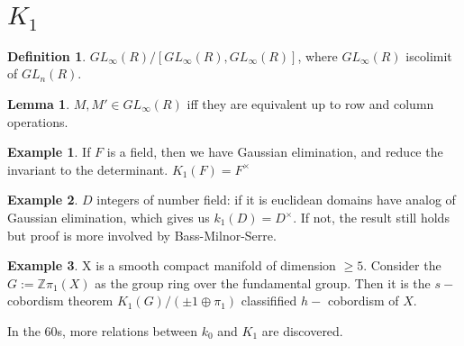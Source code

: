 \documentclass{article}
\theoremstyle{definition}
\theoremstyle{definition}
\newtheorem{definition}{Definition}[section]
\theoremstyle{definition}
\theoremstyle{definition}
\theoremstyle{definition}
\newtheorem{lemma}[theorem]{Lemma}
\theoremstyle{definition}
\theoremstyle{definition}
\newtheorem{example}{Example}[section]
\begin{document}
\section{$K_1$}

\begin{tcolorbox}[colback=purple!5!white,colframe=purple!75!black]
\begin{definition}
$GL_{\infty}(R)/[GL_{\infty}(R),GL_{\infty}(R)]$, where $GL_{\infty}(R)$ iscolimit of $GL_n(R)$.
\end{definition}
\end{tcolorbox}


\begin{tcolorbox}
\begin{lemma}
$M,M'\in GL_{\infty}(R)$ iff they are equivalent up to row and column operations. 
\end{lemma}
\end{tcolorbox}


\begin{tcolorbox}[colback=yellow!5!white,colframe=yellow!30!white]
\begin{example}
If $F$ is a field, then we have Gaussian elimination, and reduce the invariant to the determinant. $K_1(F)=F^{\times}$
\end{example}
\end{tcolorbox}


\begin{tcolorbox}[colback=yellow!5!white,colframe=yellow!30!white]
\begin{example}
$D$ integers of number field: if it is euclidean domains have analog of Gaussian elimination, which gives us $k_1(D)=D^{\times}$. If not, the result still holds but proof is more involved by Bass-Milnor-Serre. 
\end{example}
\end{tcolorbox}


\begin{tcolorbox}[colback=yellow!5!white,colframe=yellow!30!white]
\begin{example}
X is a smooth compact manifold of dimension $\geq 5$. Consider the $G:= \mathbb{Z}\pi_1(X)$ as the group ring over the fundamental group. Then it is the $s-$ cobordism theorem $K_1(G)/(\pm 1\oplus \pi_1)$ classifified $h-$ cobordism of $X$. 
\end{example}
\end{tcolorbox}

In the 60s, more relations between $k_0$ and $K_1$ are discovered. 
\end{document}
